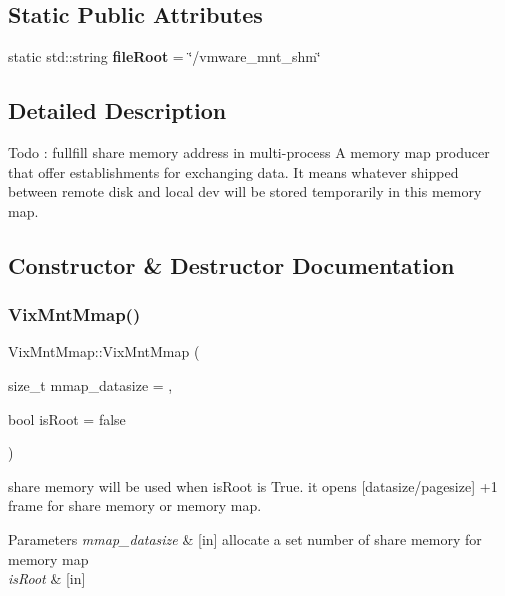 \subsection*{Static Public Attributes}
\begin{DoxyCompactItemize}
\item 
\hypertarget{class_vix_mnt_mmap_ae504d1d7377692b1e0267200e49ae539}{}\label{class_vix_mnt_mmap_ae504d1d7377692b1e0267200e49ae539} 
static std\+::string {\bfseries file\+Root} = \char`\"{}/vmware\+\_\+mnt\+\_\+shm\char`\"{}
\end{DoxyCompactItemize}


\subsection{Detailed Description}
Todo \+: fullfill share memory address in multi-\/process A memory map producer that offer establishments for exchanging data. It means whatever shipped between remote disk and local dev will be stored temporarily in this memory map. 

\subsection{Constructor \& Destructor Documentation}
\hypertarget{class_vix_mnt_mmap_ae1a3d9c99b9d94ac5a8dc14641bbb8b9}{}\label{class_vix_mnt_mmap_ae1a3d9c99b9d94ac5a8dc14641bbb8b9} 
\subsubsection{\texorpdfstring{Vix\+Mnt\+Mmap()}{VixMntMmap()}}
{\ttfamily Vix\+Mnt\+Mmap\+::\+Vix\+Mnt\+Mmap (\begin{DoxyParamCaption}\item[{size\+\_\+t}]{mmap\+\_\+datasize = {},  }\item[{bool}]{is\+Root = {\ttfamily false} }\end{DoxyParamCaption})}



share memory will be used when is\+Root is True. it opens \mbox{[}datasize/pagesize\mbox{]} +1 frame for share memory or memory map. 


\begin{DoxyParams}{Parameters}
{\em mmap\+\_\+datasize} & \mbox{[}in\mbox{]} allocate a set number of share memory for memory map \\
\hline
{\em is\+Root} & \mbox{[}in\mbox{]} \\
\hline
\end{DoxyParams}


